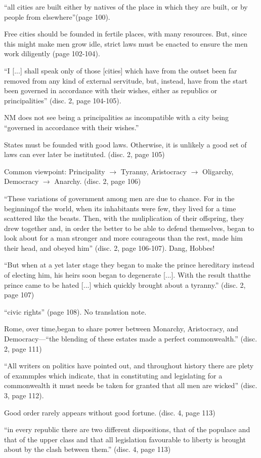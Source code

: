 \documentclass[11pt]{article}
\newcommand{\comment}[1]{{\color{Cerulean}#1}}
\newcommand{\keyquote}[1]{{\color{BrickRed}#1}}
\newcommand{\p}{page }
\newcommand{\d}{disc. }
\begin{document}
\begin{itemize}
\item
	``all cities are built either by natives of the place in which they are 
	built, or by people from elsewhere''(\p 100).
\item
	Free cities should be founded in fertile places, with many resources.
	But, since this might make men grow idle, strict laws must be enacted
	to ensure the men work diligently (\p 102-104). 
\item
	``I [...] shall speak only of those [cities] which have from the outset
	been far removed from any kind of external servitude, but, instead,
	have from the start been governed in accordance with their wishes, either
	as republics or principalities'' (\d 2, \p 104-105). 

	NM does not see being a principalities as incompatible with a city
	being ``governed in accordance with their wishes.''
\item
	States must be founded with good laws. Otherwise, it is unlikely a 
	good set of laws can ever later be instituted. (\d 2, \p 105)
\item 
	Common viewpoint: Principality $\rightarrow$ Tyranny,
	Aristocracy $\rightarrow$ Oligarchy, Democracy $\rightarrow$ Anarchy.
	(\d 2, \p 106)
\item 
	\keyquote{
	``These variations of government among men are due to chance. For in
	the beginningof the world, when its inhabitants were few, they lived for
	a time scattered like the beasts. Then, with the muliplication of their
	offspring, they drew together and, in order the better to be able to
	defend themselves, began to look about for a man stronger and more
	courageous than the rest, made him their head, and obeyed him'' 
	(\d 2, \p 106-107).	\comment{Dang, Hobbes!}
\item 
	``But when at a yet later stage they began to make the prince 
	hereditary instead of electing him, his heirs soon began to
	degenerate [...]. With the result thatthe prince came to be hated [...]
	which quickly brought about a tyranny.'' (\d 2, \p 107)
\item
	``civic rights'' (\p 108). No translation note.
\item
	Rome, over time,began to share power between Monarchy, Aristocracy,
	and Democracy---``the blending of these estates made a perfect
	commonwealth.'' (\d 2, \p 111)
\item
	\keyquote{
	``All writers on politics have pointed out, and throughout history there
	are plety of exammples which indicate, that in constituting and 
	legislating for a commonwealth it must needs be taken for granted that
	all men are wicked'' (\d 3, \p 112).
	}
\item
	Good order rarely appears without good fortune. (\d 4, \p 113)
\item
	\keyquote{``in every republic there are two different dispositions,
	that of the populace and that of the upper class and that all
	legislation favourable to liberty is brought about by the clash	
	between them.''} (\d 4, \p 113)
\item 
	

	
	}
\end{itemize}
\end{document}
